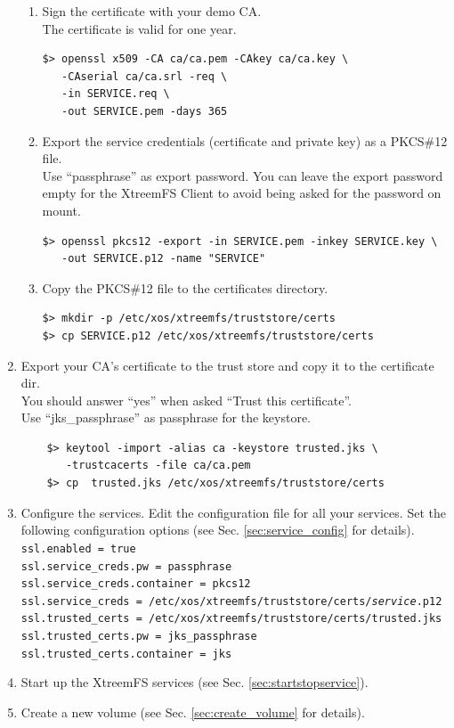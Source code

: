 \documentclass[a4paper,10pt]{book}
\begin{document}
\begin{enumerate}
\begin{enumerate}
	\item Sign the certificate with your demo CA.\\
		The certificate is valid for one year.
		\begin{verbatim}
$> openssl x509 -CA ca/ca.pem -CAkey ca/ca.key \
   -CAserial ca/ca.srl -req \
   -in SERVICE.req \
   -out SERVICE.pem -days 365
		\end{verbatim}

	\item Export the service credentials (certificate and private key) as a PKCS\#12 file.\\
		Use ``passphrase'' as export password. You can leave the export password empty for the XtreemFS Client to avoid being asked for the password on mount.
		\begin{verbatim}
$> openssl pkcs12 -export -in SERVICE.pem -inkey SERVICE.key \
   -out SERVICE.p12 -name "SERVICE"
		\end{verbatim}

	\item Copy the PKCS\#12 file to the certificates directory.
		\begin{verbatim}
$> mkdir -p /etc/xos/xtreemfs/truststore/certs
$> cp SERVICE.p12 /etc/xos/xtreemfs/truststore/certs
		\end{verbatim}

	\end{enumerate}
 \item Export your CA's certificate to the trust store and copy it to the certificate dir.\\
	You should answer ``yes'' when asked ``Trust this certificate''.\\
	Use ``jks\_passphrase'' as passphrase for the keystore.
	\begin{verbatim}
	$> keytool -import -alias ca -keystore trusted.jks \
	   -trustcacerts -file ca/ca.pem
	$> cp  trusted.jks /etc/xos/xtreemfs/truststore/certs
	\end{verbatim}

 \item Configure the services.
	Edit the configuration file for all your services. Set the following configuration options (see Sec. \ref{sec:service_config} for details).\\
	\texttt{ssl.enabled = true}\\
	\texttt{ssl.service\_creds.pw = passphrase}\\
	\texttt{ssl.service\_creds.container = pkcs12}\\
	\texttt{ssl.service\_creds = /etc/xos/xtreemfs/truststore/certs/\textit{service}.p12}\\
	\texttt{ssl.trusted\_certs = /etc/xos/xtreemfs/truststore/certs/trusted.jks}\\
	\texttt{ssl.trusted\_certs.pw = jks\_passphrase}\\
	\texttt{ssl.trusted\_certs.container = jks}
 \item Start up the XtreemFS services (see Sec. \ref{sec:startstopservice}).
 \item Create a new volume (see Sec. \ref{sec:create_volume} for details).


\end{enumerate}
\end{document}
